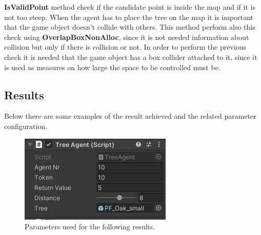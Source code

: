\documentclass[12pt]{article}
\begin{document}
    \textbf{IsValidPoint} method check if the candidate point is inside the map and if it is not too steep. When the agent has to place the tree on the map it is important that 
    the game object doesn't collide with others. This method perform also this check using \textbf{OverlapBoxNonAlloc}, since it is not needed information about collision but only
    if there is collision or not. In order to perform the previous check it is needed that the game object has a box collider attached to it, since it is used 
    as measures on how large the space to be controlled must be.

    \subsection{Results}
    Below there are some examples of the result achieved and the related parameter configuration.

    \begin{figure}[H]
        \centering
        \includegraphics[scale = 0.8]{images/Tree agent/1/Parameters}
        \caption{Parameters used for the following results.}
    \end{figure}
\end{document}
